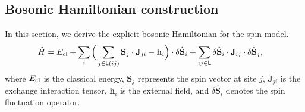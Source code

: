 \documentclass[aps, prx, nofootinbib, superscriptaddress]{revtex4-2}
\begin{document}
\subsection{Bosonic Hamiltonian construction}\label{subsec: Bosonic representations for spin exchange Hamiltonian}

In this section, we derive the explicit bosonic Hamiltonian for the spin model.
\begin{equation}
    \begin{split}
        \hat{H} 
        &= E_{\rm cl}
        + \sum_{i} \Big( \sum_{j \in \mathsf{L}(ij)} \mathbf{S}_{j} \cdot \mathbf{J}_{ji} - \mathbf{h}_{i} \Big) \cdot \delta \hat{\mathbf{S}}_{i}
        + \sum_{ij \in \mathsf{L}} \delta \hat{\mathbf{S}}_{i} \cdot \mathbf{J}_{ij} \cdot \delta \hat{\mathbf{S}}_{j},
    \end{split}
\end{equation}
where $E_{\rm cl}$ is the classical energy, $\mathbf{S}_{j}$ represents the spin vector at site $j$, $\mathbf{J}_{ji}$ is the exchange interaction tensor, $\mathbf{h}_{i}$ is the external field, and $\delta \hat{\mathbf{S}}_{i}$ denotes the spin fluctuation operator.
\end{document}
